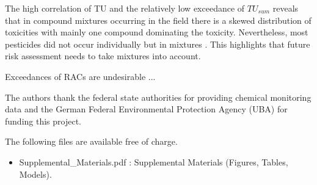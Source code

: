\documentclass[journal=esthag,manuscript=article]{achemso}
\begin{document}
The high correlation of TU and the relatively low exceedance of $TU_{sum}$ reveals that in compound mixtures occurring in the field there is a skewed distribution of toxicities with mainly one compound dominating the toxicity.
Nevertheless, most pesticides did not occur individually but in mixtures \cite{schreiner_pesticide_2016}.
This highlights that future risk assessment needs to take mixtures into account.







Exceedances of RACs are undesirable ...




\begin{acknowledgement}
The authors thank the federal state authorities for providing chemical monitoring data and the German Federal Environmental Protection Agency (UBA) for funding this project.
\end{acknowledgement}


\begin{suppinfo}
The following files are available free of charge.
\begin{itemize}
  \item Supplemental\_Materials.pdf : Supplemental Materials (Figures, Tables, Models).
\end{itemize}
\end{suppinfo}




\end{document}
